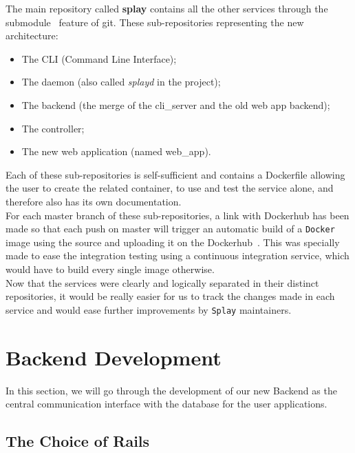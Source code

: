 \documentclass{eplmastersthesis}
\begin{document}
        The main repository called \textbf{splay} contains all the other services
        through the submodule~\cite{GitSubmodules} feature of git. These
        sub-repositories representing the new architecture:

        \begin{itemize}
          \item The CLI (Command Line Interface);
          \item The daemon (also called \textit{splayd} in the project);
          \item The backend (the merge of the cli\_server and the old web app backend);
          \item The controller;
          \item The new web application (named web\_app).
        \end{itemize}

        Each of these sub-repositories is self-sufficient and contains a Dockerfile
        allowing the user to create the related container, to use and test
        the service alone, and therefore also has its own documentation.\\

        For each master branch of these sub-repositories, a link with Dockerhub
        has been made so that each push on master will trigger an automatic build
        of a \texttt{Docker} image using the source and uploading it on the
        Dockerhub~\cite{DockerHubGithub}.
        This was specially made to ease the integration testing using a
        continuous integration service, which would have to build every single
        image otherwise.\\

        Now that the services were clearly and logically separated in their
        distinct repositories, it would be really easier for us to track
        the changes made in each service and would ease further improvements
        by \texttt{Splay} maintainers.

    \section{Backend Development}

      In this section, we will go through the development of our new Backend
      as the central communication interface with the database for the user
      applications.\\

      \subsection{The Choice of Rails}
\end{document}
